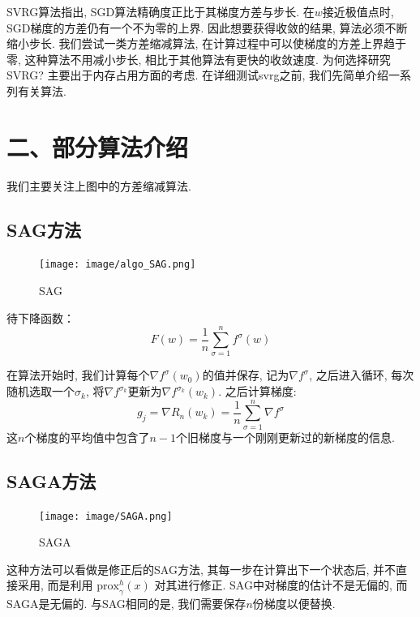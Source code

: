\documentclass{article}
\begin{document}
SVRG算法指出, SGD算法精确度正比于其梯度方差与步长. 在$w$接近极值点时, SGD梯度的方差仍有一个不为零的上界. 
因此想要获得收敛的结果, 算法必须不断缩小步长. 我们尝试一类方差缩减算法, 在计算过程中可以使梯度的方差上界趋于零, 这种算法不用减小步长, 相比于其他算法有更快的收敛速度.
为何选择研究SVRG? 主要出于内存占用方面的考虑. 在详细测试svrg之前, 我们先简单介绍一系列有关算法.

\section*{二、部分算法介绍}

我们主要关注上图中的方差缩减算法.
\subsection*{SAG方法}
\begin{figure}[h!]
    \centering
    \texttt{[image: image/algo\_SAG.png]}
    \caption{SAG}
    \label{fig:SAG}
\end{figure}
待下降函数：
\begin{equation}
    F(w)=\frac{1}{n}\sum_{\sigma=1}^n f^\sigma(w)
\end{equation}

在算法开始时, 我们计算每个$\nabla f^\sigma(w_0)$的值并保存, 记为$\nabla f^{\sigma}$, 之后进入循环, 每次随机选取一个$\sigma_k$, 将$\nabla f^{\sigma_k}$更新为$\nabla f^{\sigma_k}(w_k)$. 之后计算梯度:
\begin{equation}
    g_j = \nabla R_n(w_k)=\frac1n\sum_{\sigma=1}^n \nabla f^\sigma
\end{equation}
这$n$个梯度的平均值中包含了$n-1$个旧梯度与一个刚刚更新过的新梯度的信息.

\subsection*{SAGA方法}

\begin{figure}[h]
    \centering
    \texttt{[image: image/SAGA.png]}
    \caption{SAGA}
    \label{fig:SAGA}
\end{figure}
这种方法可以看做是修正后的SAG方法, 其每一步在计算出下一个状态后, 并不直接采用, 而是利用 $\text{prox}^h_\gamma(x)$ 对其进行修正. SAG中对梯度的估计不是无偏的, 而SAGA是无偏的. 与SAG相同的是, 我们需要保存$n$份梯度以便替换.
\end{document}
